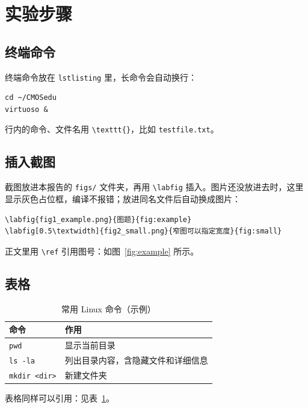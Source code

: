 \section{实验步骤}


\subsection{终端命令}

终端命令放在 \texttt{lstlisting} 里，长命令会自动换行：
\begin{lstlisting}[style=shell]
cd ~/CMOSedu
virtuoso &
\end{lstlisting}

行内的命令、文件名用 \texttt{\textbackslash texttt\{\}}，比如 \texttt{testfile.txt}。

\subsection{插入截图}

截图放进本报告的 \texttt{figs/} 文件夹，再用 \texttt{\textbackslash labfig} 插入。图片还没放进去时，这里显示灰色占位框，编译不报错；放进同名文件后自动换成图片：
\begin{lstlisting}
\labfig{fig1_example.png}{图题}{fig:example}
\labfig[0.5\textwidth]{fig2_small.png}{窄图可以指定宽度}{fig:small}
\end{lstlisting}


正文里用 \texttt{\textbackslash ref} 引用图号：如图~\ref{fig:example} 所示。

\subsection{表格}

\begin{table}[H]
  \centering
  \caption{常用 Linux 命令（示例）}
  \label{tab:cmds}
  \begin{tabular}{l>{\raggedright\arraybackslash}p{}}
    \toprule
    命令 & 作用 \\
    \midrule
    \texttt{pwd} & 显示当前目录 \\
    \texttt{ls -la} & 列出目录内容，含隐藏文件和详细信息 \\
    \texttt{mkdir <dir>} & 新建文件夹 \\
    \bottomrule
  \end{tabular}
\end{table}

表格同样可以引用：见表~\ref{tab:cmds}。
